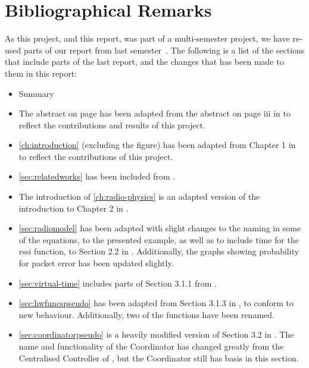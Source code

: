 \chapter{Bibliographical Remarks}
As this project, and this report, was part of a multi-semester project, we have re-used parts of
our report from last semester~\cite{paper:massivesims1}. The following is a list of the sections that include
parts of the last report, and the changes that has been made to them in this report:

\begin{itemize}
    \item Summary
    \item The abstract on page \pageref{page:titlepage} has been adapted from the abstract on page iii in
          \cite{paper:massivesims1} to reflect the contributions and results of this project.
    \item \autoref{ch:introduction} (excluding the figure) has been adapted from Chapter 1 in
          \cite{paper:massivesims1} to reflect the contributions of this project.
    \item \autoref{sec:relatedworks} has been included from \cite{paper:massivesims1}.
    \item The introduction of \autoref{ch:radio-physics} is an adapted version of the introduction to Chapter
          2 in \cite{paper:massivesims1}.
    \item \autoref{sec:radiomodel} has been adapted with slight changes to the naming in some of the
          equations, to the presented example, as well as to include time for the \gls{rssi} function, to
          Section 2.2 in \cite{paper:massivesims1}. Additionally, the graphs showing probability for packet
          error has been updated slightly.
    \item \autoref{sec:virtual-time} includes parts of Section 3.1.1 from \cite{paper:massivesims1}.
    \item \autoref{sec:hwfuncspseudo} has been adapted from Section 3.1.3 in \cite{paper:massivesims1}, to
          conform to new behaviour. Additionally, two of the functions have been renamed.
    \item \autoref{sec:coordinatorpseudo} is a heavily modified version of Section 3.2 in
          \cite{paper:massivesims1}. The name and functionality of the Coordinator has changed greatly from
          the Centralised Controller of \cite{paper:massivesims1}, but the Coordinator still has basis in this
          section.
\end{itemize}